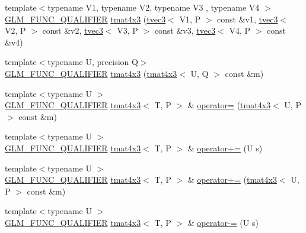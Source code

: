 \begin{DoxyCompactItemize}
\item 
{\footnotesize template$<$typename V1, typename V2, typename V3 , typename V4 $>$ }\\\hyperlink{setup_8hpp_a33fdea6f91c5f834105f7415e2a64407}{G\+L\+M\+\_\+\+F\+U\+N\+C\+\_\+\+Q\+U\+A\+L\+I\+F\+I\+ER} \hyperlink{structglm_1_1detail_1_1tmat4x3_a855ee129fe5ef20aa994a3121996b09a}{tmat4x3} (\hyperlink{structglm_1_1detail_1_1tvec3}{tvec3}$<$ V1, P $>$ const \&v1, \hyperlink{structglm_1_1detail_1_1tvec3}{tvec3}$<$ V2, P $>$ const \&v2, \hyperlink{structglm_1_1detail_1_1tvec3}{tvec3}$<$ V3, P $>$ const \&v3, \hyperlink{structglm_1_1detail_1_1tvec3}{tvec3}$<$ V4, P $>$ const \&v4)
\item 
{\footnotesize template$<$typename U, precision Q$>$ }\\\hyperlink{setup_8hpp_a33fdea6f91c5f834105f7415e2a64407}{G\+L\+M\+\_\+\+F\+U\+N\+C\+\_\+\+Q\+U\+A\+L\+I\+F\+I\+ER} \hyperlink{structglm_1_1detail_1_1tmat4x3_a52fb0f3d88fbe4449d065ac3c9dc0984}{tmat4x3} (\hyperlink{structglm_1_1detail_1_1tmat4x3}{tmat4x3}$<$ U, Q $>$ const \&m)
\item 
{\footnotesize template$<$typename U $>$ }\\\hyperlink{setup_8hpp_a33fdea6f91c5f834105f7415e2a64407}{G\+L\+M\+\_\+\+F\+U\+N\+C\+\_\+\+Q\+U\+A\+L\+I\+F\+I\+ER} \hyperlink{structglm_1_1detail_1_1tmat4x3}{tmat4x3}$<$ T, P $>$ \& \hyperlink{structglm_1_1detail_1_1tmat4x3_a887443085fbd9cd29710306c99edede2}{operator=} (\hyperlink{structglm_1_1detail_1_1tmat4x3}{tmat4x3}$<$ U, P $>$ const \&m)
\item 
{\footnotesize template$<$typename U $>$ }\\\hyperlink{setup_8hpp_a33fdea6f91c5f834105f7415e2a64407}{G\+L\+M\+\_\+\+F\+U\+N\+C\+\_\+\+Q\+U\+A\+L\+I\+F\+I\+ER} \hyperlink{structglm_1_1detail_1_1tmat4x3}{tmat4x3}$<$ T, P $>$ \& \hyperlink{structglm_1_1detail_1_1tmat4x3_a4ad2b7cf1ca8473d377b1a6bfbdb7f53}{operator+=} (U s)
\item 
{\footnotesize template$<$typename U $>$ }\\\hyperlink{setup_8hpp_a33fdea6f91c5f834105f7415e2a64407}{G\+L\+M\+\_\+\+F\+U\+N\+C\+\_\+\+Q\+U\+A\+L\+I\+F\+I\+ER} \hyperlink{structglm_1_1detail_1_1tmat4x3}{tmat4x3}$<$ T, P $>$ \& \hyperlink{structglm_1_1detail_1_1tmat4x3_af8c2c8f9977ae873d3c26b5027363fcf}{operator+=} (\hyperlink{structglm_1_1detail_1_1tmat4x3}{tmat4x3}$<$ U, P $>$ const \&m)
\item 
{\footnotesize template$<$typename U $>$ }\\\hyperlink{setup_8hpp_a33fdea6f91c5f834105f7415e2a64407}{G\+L\+M\+\_\+\+F\+U\+N\+C\+\_\+\+Q\+U\+A\+L\+I\+F\+I\+ER} \hyperlink{structglm_1_1detail_1_1tmat4x3}{tmat4x3}$<$ T, P $>$ \& \hyperlink{structglm_1_1detail_1_1tmat4x3_af3a1782be12d9d822cc6fc21b94fe319}{operator-\/=} (U s)

\end{DoxyCompactItemize}
